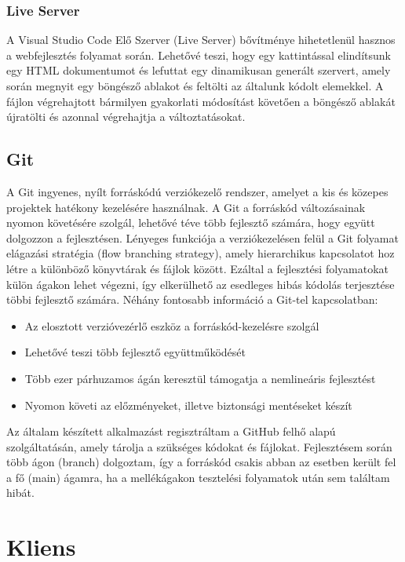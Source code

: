 \subsubsection{Live Server}

A Visual Studio Code Elő Szerver (Live Server) bővítménye hihetetlenül hasznos a webfejlesztés folyamat során. Lehetővé teszi, hogy egy kattintással elindítsunk egy HTML dokumentumot és lefuttat egy dinamikusan generált szervert, amely során megnyit egy böngésző ablakot és feltölti az általunk kódolt elemekkel. A fájlon végrehajtott bármilyen gyakorlati módosítást követően a böngésző ablakát újratölti és azonnal végrehajtja a változtatásokat. 

\subsection{Git }

A Git ingyenes, nyílt forráskódú verziókezelő rendszer, amelyet a kis és közepes projektek hatékony kezelésére használnak. A Git a forráskód változásainak nyomon követésére szolgál, lehetővé téve több fejlesztő számára, hogy együtt dolgozzon a fejlesztésen. Lényeges funkciója a verziókezelésen felül a Git folyamat elágazási stratégia (flow branching strategy), amely hierarchikus kapcsolatot hoz létre a különböző könyvtárak és fájlok között. Ezáltal a fejlesztési folyamatokat külön ágakon lehet végezni, így elkerülhető az esedleges hibás kódolás terjesztése többi fejlesztő számára. Néhány fontosabb információ a Git-tel kapcsolatban: 

\begin{itemize}
\item Az elosztott verzióvezérlő eszköz a forráskód-kezelésre szolgál
\item Lehetővé teszi több fejlesztő együttműködését
\item Több ezer párhuzamos ágán keresztül támogatja a nemlineáris fejlesztést
\item Nyomon követi az előzményeket, illetve biztonsági mentéseket készít \cite{git}
\end{itemize}

Az általam készített alkalmazást regisztráltam a GitHub felhő alapú szolgáltatásán, amely tárolja a szükséges kódokat és fájlokat. Fejlesztésem során több ágon (branch) dolgoztam, így a forráskód csakis abban az esetben került fel a fő (main) ágamra, ha a mellékágakon tesztelési folyamatok után sem találtam hibát.

\section{Kliens}

